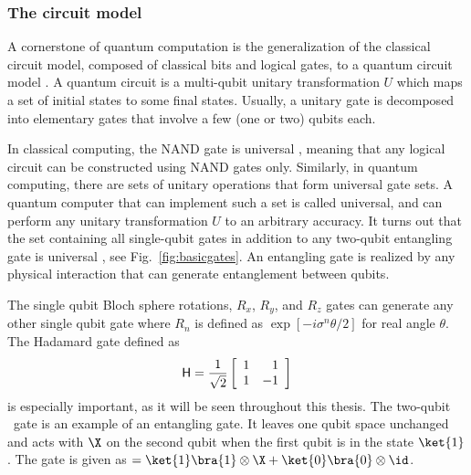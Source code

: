 \documentclass[11pt,oneside,final]{huthesis}%
\begin{document}

\subsubsection{The circuit model}\label{sssec:cir}

A cornerstone of quantum computation is the generalization of the classical
circuit model, composed of classical bits and logical gates, to a quantum
circuit model \cite{Deutsch89,Barenco95,Nielsen00}. A quantum circuit is a
multi-qubit unitary transformation $U$ which maps a set of initial states to
some final states. Usually, a unitary gate is decomposed into elementary gates
that involve a few (one or two) qubits each.

In classical computing, the {\sf NAND} gate is universal \cite{Null03},
meaning that any logical circuit can be constructed using {\sf NAND} gates only.
Similarly, in quantum computing, there are sets of unitary operations that form
universal gate sets. A quantum computer that can implement such a set is called
universal, and can perform any unitary transformation $U$ to an arbitrary
accuracy. It turns out that the set containing all single-qubit gates in
addition to any two-qubit entangling gate is universal
\cite{Kaye07}, see Fig.~\ref{fig:basicgates}. An entangling gate is realized by
any physical interaction that can generate entanglement between qubits.

The single qubit Bloch sphere rotations, $R_x$, $R_y$, and $R_z$ gates can generate any other single qubit gate {where} $R_n$ is defined as $\exp[-i \sigma^n \theta/2]$ for real angle $\theta$. The Hadamard gate defined as
\[
{\sf H}=
\frac{1}{\sqrt{2}}
\left[
\begin{array}{cr}
	1 & 1\\
	1 & -1
\end{array}
\right]
\]
is especially important, as it will be seen throughout this thesis. 
The two-qubit \cnot~gate is an example of an entangling gate. It leaves one qubit space {unchanged} and acts with $\X$ on the second qubit when the first qubit is in the state $\ket{1}$.  The gate is given as \cnot$=\ket{1}\bra{1}\otimes \X + \ket{0}\bra{0}\otimes \id$.
\end{document}
